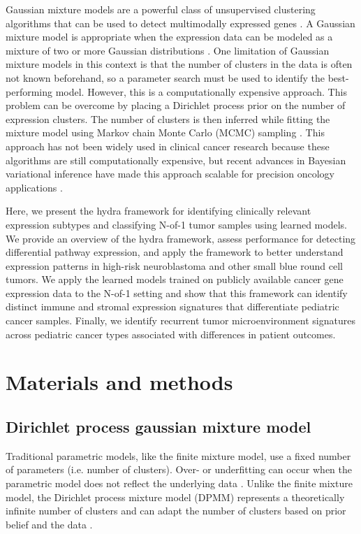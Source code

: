 \documentclass[10pt,letterpaper]{article}
\begin{document}
Gaussian mixture models are a powerful class of unsupervised clustering algorithms that can be used to detect multimodally expressed genes \cite{ghoshMixtureModelsAssessing2004,dahlModelBasedClusteringExpression2006,kimVariableSelectionClustering2006}. A Gaussian mixture model is appropriate when the expression data can be modeled as a mixture of two or more Gaussian distributions \cite{gelmanBayesianDataAnalysis2013}. One limitation of Gaussian mixture models in this context is that the number of clusters in the data is often not known beforehand, so a parameter search must be used to identify the best-performing model. However, this is a computationally expensive approach. This problem can be overcome by placing a Dirichlet process prior on the number of expression clusters. The number of clusters is then inferred while fitting the mixture model using Markov chain Monte Carlo (MCMC) sampling \cite{gelmanBayesianDataAnalysis2013}. This approach has not been widely used in clinical cancer research because these algorithms are still computationally expensive, but recent advances in Bayesian variational inference have made this approach scalable for precision oncology applications \cite{thallBayesianNonparametricStatistics2017}.

Here, we present the hydra framework for identifying clinically relevant expression subtypes and classifying N-of-1 tumor samples using learned models. We provide an overview of the hydra framework, assess performance for detecting differential pathway expression, and apply the framework to better understand expression patterns in high-risk neuroblastoma and other small blue round cell tumors. We apply the learned models trained on publicly available cancer gene expression data to the N-of-1 setting and show that this framework can identify distinct immune and stromal expression signatures that differentiate pediatric cancer samples. Finally, we identify recurrent tumor microenvironment signatures across pediatric cancer types associated with differences in patient outcomes.

\section*{Materials and methods}
\subsection*{Dirichlet process gaussian mixture model}
Traditional parametric models, like the finite mixture model, use a fixed number of parameters (i.e. number of clusters). Over- or underfitting can occur when the parametric model does not reflect the underlying data \cite{teh2010dirichlet}. Unlike the finite mixture model, the Dirichlet process mixture model (DPMM) represents a theoretically infinite number of clusters and can adapt the number of clusters based on prior belief and the data \cite{gelmanBayesianDataAnalysis2013, antoniakMixturesDirichletProcesses1974, teh2010dirichlet}.
\end{document}
